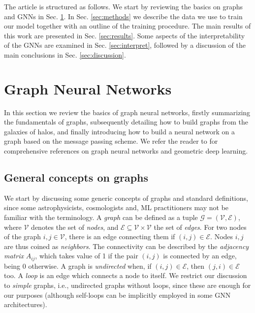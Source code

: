 \documentclass[twocolumn]{aastex631}
\begin{document}
The article is structured as follows. We start by reviewing the basics on graphs and GNNs in Sec. \ref{sec:gnn}. In Sec. \ref{sec:methods} we describe the data we use to train our model together with an outline of the training procedure. The main results of this work are presented in Sec. \ref{sec:results}. Some aspects of the interpretability of the GNNs are examined in Sec. \ref{sec:interpret}, followed by a discussion of the main conclusions in Sec. \ref{sec:discussion}.


\section{Graph Neural Networks}
\label{sec:gnn}


In this section we review the basics of graph neural networks, firstly summarizing the fundamentals of graphs, subsequently detailing how to build graphs from the galaxies of halos, and finally introducing how to build a neural network on a graph based on the message passing scheme. We refer the reader to \cite{2021arXiv210413478B, 2018arXiv180601261B, HamiltonBook} for comprehensive references on graph neural networks and geometric deep learning.

\subsection{General concepts on graphs}

We start by discussing some generic concepts of graphs and standard definitions, since some astrophysicists, cosmologists and, ML practitioners may not be familiar with the terminology. A \textit{graph} can be defined as a tuple $\mathcal{G}=(\mathcal{V},\mathcal{E})$, where $\mathcal{V}$ denotes the set of \textit{nodes}, and $\mathcal{E} \subseteq \mathcal{V} \times \mathcal{V}$ the set of \textit{edges}. For two nodes of the graph $i, j \in \mathcal{V}$, there is an edge connecting them if $(i,j) \in \mathcal{E}$. Nodes $i, j$ are thus coined as \textit{neighbors}. The connectivity can be described by the \textit{adjacency matrix} $A_{ij}$, which takes value of 1 if the pair $(i,j)$ is connected by an edge, being $0$ otherwise. A graph is \textit{undirected} when, if $(i,j) \in \mathcal{E}$, then $(j,i) \in \mathcal{E}$ too. A \textit{loop} is an edge which connects a node to itself. We restrict our discussion to \textit{simple} graphs, i.e., undirected graphs without loops, since these are enough for our purposes (although self-loops can be implicitly employed in some GNN architectures). 
\end{document}
